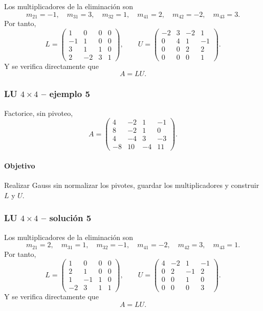 Los multiplicadores de la eliminación son
\[
m_{21}=-1,\quad m_{31}=3,\quad m_{32}=1,\quad m_{41}=2,\quad m_{42}=-2,\quad m_{43}=3.
\]
Por tanto,
\[
L=\begin{pmatrix}1 & 0 & 0 & 0\\-1 & 1 & 0 & 0\\3 & 1 & 1 & 0\\2 & -2 & 3 & 1\end{pmatrix},\qquad U=\begin{pmatrix}-2 & 3 & -2 & 1\\0 & 4 & 1 & -1\\0 & 0 & 2 & 2\\0 & 0 & 0 & 1\end{pmatrix}.
\]
Y se verifica directamente que
\[
\boxed{A=LU}.
\]


\subsubsection*{LU $4\times 4$ -- ejemplo 5}

Factorice, sin pivoteo,
\[
A=\begin{pmatrix}4 & -2 & 1 & -1\\8 & -2 & 1 & 0\\4 & -4 & 3 & -3\\-8 & 10 & -4 & 11\end{pmatrix}.
\]

\paragraph{Objetivo}
Realizar Gauss sin normalizar los pivotes, guardar los multiplicadores y construir $L$ y $U$.



\subsubsection*{LU $4\times 4$ -- solución 5}

Los multiplicadores de la eliminación son
\[
m_{21}=2,\quad m_{31}=1,\quad m_{32}=-1,\quad m_{41}=-2,\quad m_{42}=3,\quad m_{43}=1.
\]
Por tanto,
\[
L=\begin{pmatrix}1 & 0 & 0 & 0\\2 & 1 & 0 & 0\\1 & -1 & 1 & 0\\-2 & 3 & 1 & 1\end{pmatrix},\qquad U=\begin{pmatrix}4 & -2 & 1 & -1\\0 & 2 & -1 & 2\\0 & 0 & 1 & 0\\0 & 0 & 0 & 3\end{pmatrix}.
\]
Y se verifica directamente que
\[
\boxed{A=LU}.
\]

